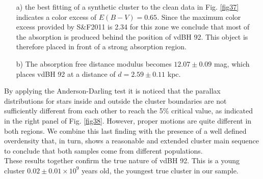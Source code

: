 \documentclass[draft]{aa}
\begin{document}
\begin{itemize}
\item [a)] the best fitting of a synthetic cluster to the clean data in Fig. 
    \ref{fig37} indicates a color excess of $E(B-V)=0.65$. Since the
    maximum color excess provided by S\&F2011 is 2.34 for this zone we
    conclude that most of the absorption is produced behind the position of
    vdBH 92. This object is therefore placed in front of a strong
    absorption region.
\item [b)] The absorption free distance modulus becomes
$12.07\pm0.09$ mag, which places vdBH 92 at a distance of $d=2.59\pm0.11$ kpc.
\end{itemize}

By applying the Anderson-Darling test it is noticed that the parallax
distributions for stars inside and outside the cluster boundaries are not
sufficiently different from each other to reach the 5\% critical value, as
indicated in the right panel of Fig. \ref{fig38}. However, proper motions are
quite different in both regions. We combine this last finding with the
presence of a well defined overdensity that, in turn, shows a reasonable and
extended cluster main sequence to conclude that both samples come from
different populations.\\

These results together confirm the true nature of vdBH 92. This is a
young cluster $0.02\pm0.01\times10^9$ years old, the youngest true cluster
in our sample.
\end{document}
